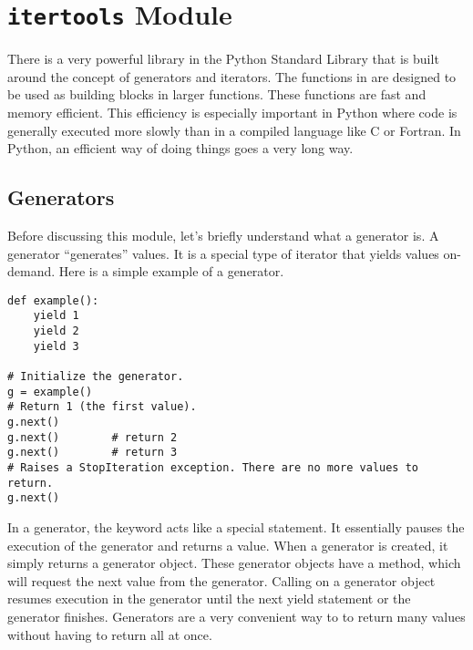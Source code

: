 \section*{\texttt{itertools} Module}
There is a very powerful library in the Python Standard Library that is built around the concept
of generators and iterators.  The functions in  are designed to be used as
building blocks in larger functions.  These functions are fast and memory efficient.
This efficiency is especially important in Python where code is generally executed more slowly than in a compiled language like C or Fortran.
In Python, an efficient way of doing things goes a very long way.

\subsection*{Generators}
Before discussing this module, let's briefly understand what a generator is.
A generator ``generates'' values.  It is a special type of iterator that yields values on-demand.  Here is a simple example of a generator.
\begin{lstlisting}
def example():
    yield 1
    yield 2
    yield 3

# Initialize the generator.
g = example()
# Return 1 (the first value).
g.next()
g.next()        # return 2
g.next()        # return 3
# Raises a StopIteration exception. There are no more values to return.
g.next()
\end{lstlisting}
In a generator, the  keyword acts like a special  statement.
It essentially pauses the execution of the generator and returns a value.
When a generator is created, it simply returns a generator object.
These generator objects have a  method, which will request the next value from the generator.
Calling  on a generator object resumes execution in the generator until the next yield statement or the generator finishes.
Generators are a very convenient way to to return many values without having to return all at once.

